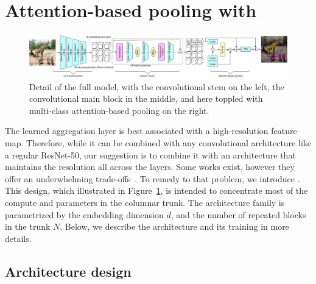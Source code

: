 \section{Attention-based pooling with \ournet}
\label{sec:architecture}

\begin{figure}[ht]
    \centering
     \includegraphics[width=1.0\linewidth,clip,trim=0 0 0 0pt]{figs/patchconv.pdf}
    \caption{Detail of the full model, with the convolutional stem on the left, the convolutional main block in the middle, and here toppled with multi-class attention-based pooling on the right.
    \label{fig:full_model}}
\end{figure}

The learned aggregation layer is best associated with a high-resolution feature map. Therefore, while it can be combined with any convolutional architecture like a regular ResNet-50, our suggestion is to combine it with an architecture that maintains the resolution all across the layers. Some works exist, however they offer an underwhelming trade-offs~\cite{tolstikhin2021MLPMixer,Touvron2021ResMLPFN}. To remedy to that problem, we introduce \ournet. This design, which illustrated in Figure~\ref{fig:full_model}, 
is intended to concentrate most of the compute and parameters in the columnar trunk. 
The architecture family is parametrized by the embedding dimension $d$, and the number of repeated blocks in the trunk $N$. 
Below, we describe the architecture and its training in more details.  

\subsection{Architecture design}



